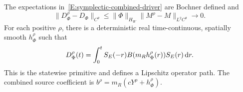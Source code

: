 \begin{lemma}
  \label{L:symplectic-source-mean}
  The expectations in~\eqref{E:symplectic-combined-driver} are Bochner defined
  and
  \begin{equation}\label{E:symplectic-mean-convergence}
    \|D_\Phi^\rho-D_\Phi\|_{C^\theta}
    \le\|\Phi\|_{H_W}\|M^\rho-M\|_{L^2C^\theta}\longrightarrow0 .
  \end{equation}
  For each positive $\rho$, there is a deterministic real time-continuous,
  spatially smooth $h_\Phi^\rho$ such that
  \begin{equation}\label{E:symplectic-source-primitive}
    D_\Phi^\rho(t)
    =\int_0^t S_E(-r)B(m_Rh_\Phi^\rho(r))S_E(r)\,\mathrm{d} r .
  \end{equation}
  This is the statewise primitive and defines a Lipschitz operator path. The
  combined source coefficient is $b^\rho = m_R(cY^\rho+h_\Phi^\rho)$.
\end{lemma}

